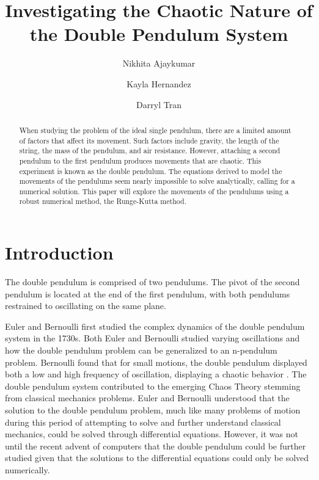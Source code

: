 \documentclass[linenumbers,RNAAS,trackchanges]{aastex631}
\begin{document}
\title{Investigating the Chaotic Nature of the Double Pendulum System}
\correspondingauthor{}
\author{Nikhita Ajaykumar}

\author{Kayla Hernandez}


\author{Darryl Tran}

\begin{abstract}
When studying the problem of the ideal single pendulum, there are a limited amount of factors that affect its movement. Such factors include gravity, the length of the string, the mass of the pendulum, and air resistance. However, attaching a second pendulum to the first pendulum produces movements that are chaotic. This experiment is known as the double pendulum. The equations derived to model the movements of the pendulums seem nearly impossible to solve analytically, calling for a numerical solution. This paper will explore the movements of the pendulums using a robust numerical method, the Runge-Kutta method. 
\end{abstract}

\section{Introduction} \label{sec:intro}
	The double pendulum is comprised of two pendulums. The pivot of the second pendulum is located at the end of the first pendulum, with both pendulums restrained to oscillating on the same plane.  
 
	Euler and Bernoulli first studied the complex dynamics of the double pendulum system in the 1730s. Both Euler and Bernoulli studied varying oscillations and how the double pendulum problem can be generalized to an n-pendulum problem. \cite{acheson_1998} Bernoulli found that for small motions, the double pendulum displayed both a low and high frequency of oscillation, displaying a chaotic behavior \cite{acheson_1998}. The double pendulum system contributed to the emerging Chaos Theory stemming from classical mechanics problems. Euler and Bernoulli understood that the solution to the double pendulum problem, much like many problems of motion during this period of attempting to solve and further understand classical mechanics, could be solved through differential equations. However, it was not until the recent advent of computers that the double pendulum could be further studied given that the solutions to the differential equations could only be solved numerically. 
 
\end{document}
